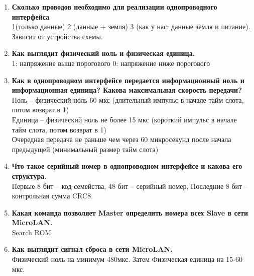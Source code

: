\documentclass[a4paper, 12pt, twoside]{article}
\begin{document}
\begin{enumerate}
	\item \textbf{Сколько проводов необходимо для реализации однопроводного интерфейса}\\
		1(только данные) 2 (данные + земля) 3 (как у нас: данные земля и питание). Зависит от устройства схемы.
	\item \textbf{Как выглядит физический ноль и физическая единица.}\\
		1: напряжение выше порогового
		0: напряжение ниже порогового
	\item \textbf{Как в однопроводном интерфейсе передается информационный ноль и
информационная единица? Какова максимальная скорость передачи?}\\
		Ноль – физический ноль 60 мкс (длительный импульс в начале тайм слота, потом возврат в 1)\\
		Единица – физический ноль не более 15 мкс (короткий импульс в начале тайм слота, потом возврат в 1)\\
		Очередная передача не раньше чем через 60 микросекунд после начала предыдущей (минимальный размер тайм слота)
	\item \textbf{Что такое серийный номер в однопроводном интерфейсе и какова его
структура.}\\
		Первые 8 бит – код семейства, 48 бит – серийный номер, Последние 8 бит – контрольная сумма CRC8.
	\item \textbf{Какая команда позволяет Master определить номера всех Slave в сети
MicroLAN.}\\ 
		Search ROM
	\item \textbf{Как выглядит сигнал сброса в сети MicroLAN.}\\
		Физический ноль на минимум 480мкс. Затем Физическая единица на 15-60 мкс.
\end{enumerate}
\end{document}
